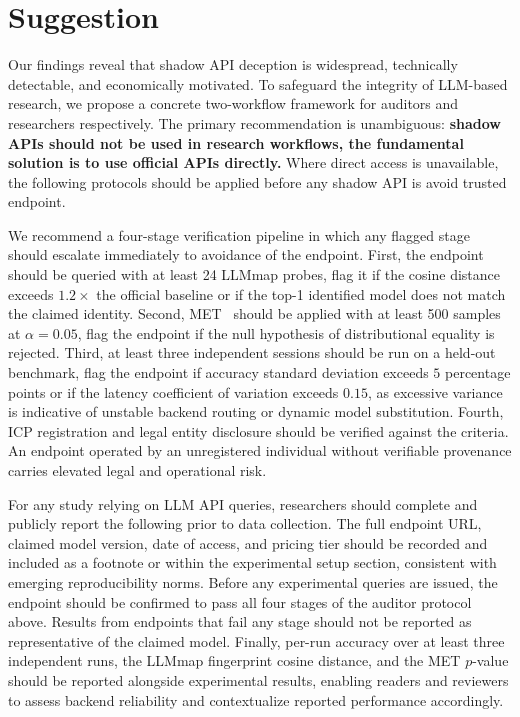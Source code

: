 \documentclass[letterpaper,twocolumn,10pt]{article}
\begin{document}
\section{Suggestion}
\label{sec:suggestion}
Our findings reveal that shadow API deception is widespread, technically detectable, and economically motivated.
To safeguard the integrity of LLM-based research, we propose a concrete two-workflow framework for auditors and researchers respectively.
The primary recommendation is unambiguous: \textbf{shadow APIs should not be used in research workflows, the fundamental solution is to use official APIs directly.}
Where direct access is unavailable, the following protocols should be applied before any shadow API is avoid trusted endpoint.

We recommend a four-stage verification pipeline in which any flagged stage should escalate immediately to avoidance of the endpoint.
First, the endpoint should be queried with at least 24 LLMmap probes, flag it if the cosine distance exceeds $1.2\times$ the official baseline or if the top-1 identified model does not match the claimed identity.
Second, MET~\cite{GLG24} should be applied with at least 500 samples at $\alpha = 0.05$, flag the endpoint if the null hypothesis of distributional equality is rejected.
Third, at least three independent sessions should be run on a held-out benchmark, flag the endpoint if accuracy standard deviation exceeds $5$ percentage points or if the latency coefficient of variation exceeds $0.15$, as excessive variance is indicative of unstable backend routing or dynamic model substitution.
Fourth, ICP registration and legal entity disclosure should be verified against the criteria.
An endpoint operated by an unregistered individual without verifiable provenance carries elevated legal and operational risk.

For any study relying on LLM API queries, researchers should complete and publicly report the following prior to data collection.
The full endpoint URL, claimed model version, date of access, and pricing tier should be recorded and included as a footnote or within the experimental setup section, consistent with emerging reproducibility norms.
Before any experimental queries are issued, the endpoint should be confirmed to pass all four stages of the auditor protocol above. 
Results from endpoints that fail any stage should not be reported as representative of the claimed model.
Finally, per-run accuracy over at least three independent runs, the LLMmap fingerprint cosine distance, and the MET $p$-value should be reported alongside experimental results, enabling readers and reviewers to assess backend reliability and contextualize reported performance accordingly.
\end{document}
